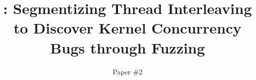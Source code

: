 \title{\sys: Segmentizing Thread Interleaving to Discover Kernel Concurrency Bugs through Fuzzing}

\ifdefined\DRAFT
 \pagestyle{fancyplain}
 \rhead{\thedate}
\fi



\author{
  Paper \#2
}


